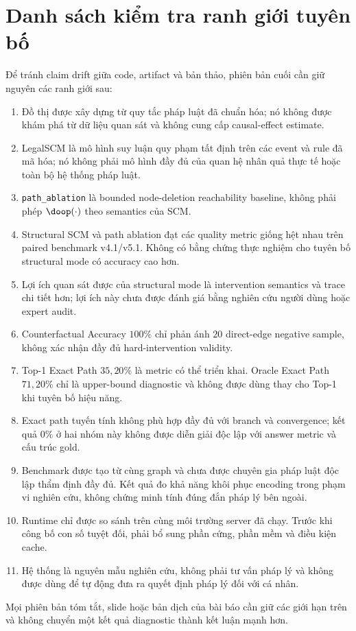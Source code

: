 \section{Danh sách kiểm tra ranh giới tuyên bố}
\label{app:claims}

Để tránh claim drift giữa code, artifact và bản thảo, phiên bản cuối cần giữ
nguyên các ranh giới sau:

\begin{enumerate}
    \item Đồ thị được xây dựng từ quy tắc pháp luật đã chuẩn hóa; nó không
    được khám phá từ dữ liệu quan sát và không cung cấp causal-effect
    estimate.

    \item LegalSCM là mô hình suy luận quy phạm tất định trên các event và
    rule đã mã hóa; nó không phải mô hình đầy đủ của quan hệ nhân quả thực tế
    hoặc toàn bộ hệ thống pháp luật.

    \item \texttt{path\_ablation} là bounded node-deletion reachability
    baseline, không phải phép $\doop(\cdot)$ theo semantics của SCM.

    \item Structural SCM và path ablation đạt các quality metric giống hệt
    nhau trên paired benchmark v4.1/v5.1. Không có bằng chứng thực nghiệm cho
    tuyên bố structural mode có accuracy cao hơn.

    \item Lợi ích quan sát được của structural mode là intervention semantics
    và trace chi tiết hơn; lợi ích này chưa được đánh giá bằng nghiên cứu
    người dùng hoặc expert audit.

    \item Counterfactual Accuracy $100\%$ chỉ phản ánh $20$ direct-edge
    negative sample, không xác nhận đầy đủ hard-intervention validity.

    \item Top-1 Exact Path $35{,}20\%$ là metric có thể triển khai. Oracle
    Exact Path $71{,}20\%$ chỉ là upper-bound diagnostic và không được dùng
    thay cho Top-1 khi tuyên bố hiệu năng.

    \item Exact path tuyến tính không phù hợp đầy đủ với branch và
    convergence; kết quả $0\%$ ở hai nhóm này không được diễn giải độc lập
    với answer metric và cấu trúc gold.

    \item Benchmark được tạo từ cùng graph và chưa được chuyên gia pháp luật
    độc lập thẩm định đầy đủ. Kết quả đo khả năng khôi phục encoding trong
    phạm vi nghiên cứu, không chứng minh tính đúng đắn pháp lý bên ngoài.

    \item Runtime chỉ được so sánh trên cùng môi trường server đã chạy. Trước
    khi công bố con số tuyệt đối, phải bổ sung phần cứng, phần mềm và điều
    kiện cache.

    \item Hệ thống là nguyên mẫu nghiên cứu, không phải tư vấn pháp lý và
    không được dùng để tự động đưa ra quyết định pháp lý đối với cá nhân.
\end{enumerate}

Mọi phiên bản tóm tắt, slide hoặc bản dịch của bài báo cần giữ các giới hạn
trên và không chuyển một kết quả diagnostic thành kết luận mạnh hơn.